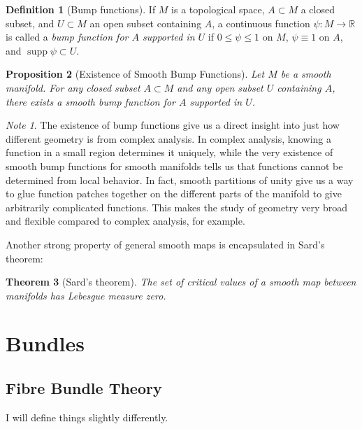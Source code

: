 \documentclass[reqno]{amsart}
\newtheorem{theorem}{Theorem}[section]
\newtheorem{proposition}[theorem]{Proposition}
\theoremstyle{definition}
\newtheorem{definition}[theorem]{Definition}
\theoremstyle{remark}
\newtheorem*{note}{Note}
\DeclareMathOperator{\supp}{supp}
\begin{document}
\begin{definition}[Bump functions]
    If $M$ is a topological space, $A \subset M$ 
    a closed subset, and
    $U \subset M$ an open subset containing $A$, a
    continuous function
    $\psi \colon M \to \mathbb{R}$ is called a
    \textit{bump function for $A$ supported
    in $U$} if $0 \le \psi  \le 1$ on
    $M$, $\psi \equiv 1$ on $A$, and $\supp \psi \subset U$.
\end{definition}

\begin{proposition}[Existence of Smooth Bump Functions]
    Let $M$ be a smooth manifold. For any closed
    subset $A \subset M$ and any open subset
    $U$ containing $A$, there exists a smooth bump function
    for $A$ supported in $U$.
\end{proposition}

\begin{note}
    The existence of bump functions give us a
    direct insight into just how different
    geometry is from complex analysis. 
    In complex analysis, knowing a function in a
    small region determines it uniquely, while
    the very existence of smooth bump functions
    for smooth manifolds tells us
    that functions cannot be determined from local
    behavior.
    In fact, smooth partitions of unity give
    us a way to glue function patches together
    on the different parts of the manifold to give
    arbitrarily complicated functions.
    This makes the study of geometry very broad and flexible compared
    to complex analysis, for example.
\end{note}


Another strong property of general smooth maps is
encapsulated in Sard's theorem:

\begin{theorem}[Sard's theorem]
    The set of critical values of a smooth
    map between manifolds has Lebesgue measure zero.
\end{theorem}



\section{Bundles}

    \subsection{Fibre Bundle Theory}
    I will define things slightly differently.
\end{document}
